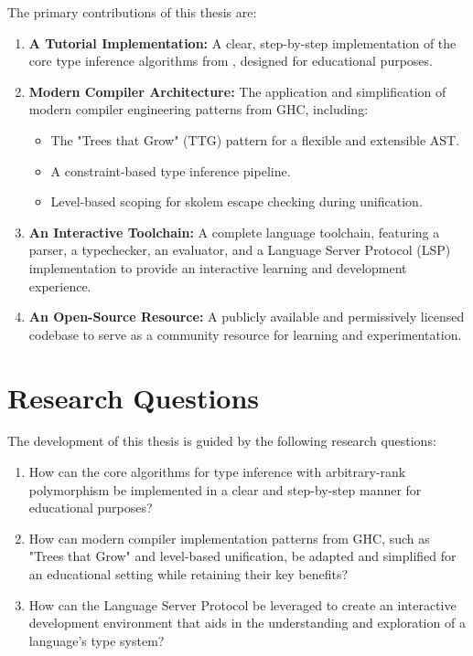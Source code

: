 The primary contributions of this thesis are:
\begin{enumerate}
    \item \textbf{A Tutorial Implementation:} A clear, step-by-step implementation of the core type inference algorithms from \cite{jones-practical-2007}, designed for educational purposes.
    \item \textbf{Modern Compiler Architecture:} The application and simplification of modern compiler engineering patterns from GHC, including:
    \begin{itemize}
        \item The "Trees that Grow" (TTG) pattern for a flexible and extensible AST.
        \item A constraint-based type inference pipeline.
        \item Level-based scoping for skolem escape checking during unification.
    \end{itemize}
    \item \textbf{An Interactive Toolchain:} A complete language toolchain, featuring a parser, a typechecker, an evaluator, and a Language Server Protocol (LSP) implementation to provide an interactive learning and development experience.
    \item \textbf{An Open-Source Resource:} A publicly available and permissively licensed codebase \cite{deemp-arbitrary-rank-tutorial} to serve as a community resource for learning and experimentation.
\end{enumerate}

\section{Research Questions}

The development of this thesis is guided by the following research questions:
\begin{enumerate}
    \item How can the core algorithms for type inference with arbitrary-rank polymorphism be implemented in a clear and step-by-step manner for educational purposes?
    \item How can modern compiler implementation patterns from GHC, such as "Trees that Grow" and level-based unification, be adapted and simplified for an educational setting while retaining their key benefits?
    \item How can the Language Server Protocol be leveraged to create an interactive development environment that aids in the understanding and exploration of a language's type system?
\end{enumerate}

